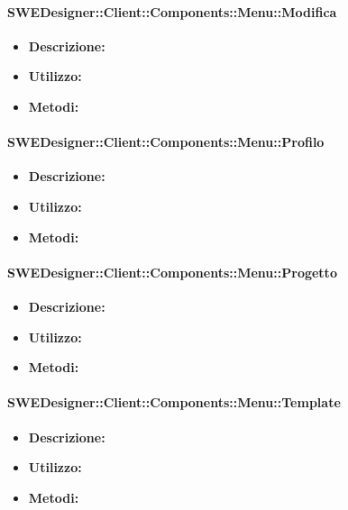 			\paragraph{SWEDesigner::Client::Components::Menu::Modifica}
				\begin{itemize}
          			\item \textbf{Descrizione:}\\
          			\item \textbf{Utilizzo:}\\
          			\item \textbf{Metodi:}\\
          		\end{itemize}
			\paragraph{SWEDesigner::Client::Components::Menu::Profilo}
				\begin{itemize}
          			\item \textbf{Descrizione:}\\
          			\item \textbf{Utilizzo:}\\
          			\item \textbf{Metodi:}\\
          		\end{itemize}
			\paragraph{SWEDesigner::Client::Components::Menu::Progetto}
				\begin{itemize}
          			\item \textbf{Descrizione:}\\
          			\item \textbf{Utilizzo:}\\
          			\item \textbf{Metodi:}\\
          		\end{itemize}
			\paragraph{SWEDesigner::Client::Components::Menu::Template}
				\begin{itemize}
          			\item \textbf{Descrizione:}\\
          			\item \textbf{Utilizzo:}\\
          			\item \textbf{Metodi:}\\
          		\end{itemize}